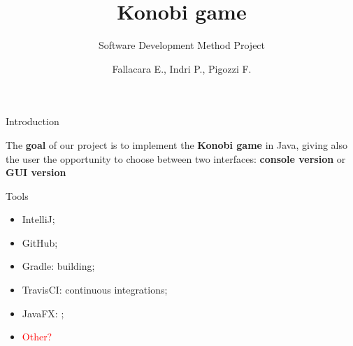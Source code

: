 \documentclass{beamer}
\title{Konobi game}
\subtitle{Software Development Method Project}
\author{Fallacara E., Indri P., Pigozzi F.}
\date{}
\begin{document}
	\setcounter{showSlideNumbers}{0}

	\frame{\titlepage}

	\setcounter{framenumber}{0}
	\setcounter{showSlideNumbers}{1}

  

  \begin{frame}{Introduction}

    \begin{tcolorbox}[colback=red!90!black!10]
      The \textbf{goal} of our project is to implement the \textbf{Konobi game} in Java, giving also the user the opportunity to choose between two interfaces: \textbf{console version} or \textbf{GUI version}
    \end{tcolorbox}

    \vspace{1em}

    \begin{block}{Tools}
      \begin{itemize}
        \item IntelliJ;
        \item GitHub;
        \item Gradle: building;
        \item TravisCI: continuous integrations;
        \item JavaFX: ;
        \item \textcolor{red}{Other?}
      \end{itemize}
    \end{block}

  \end{frame}
\end{document}
